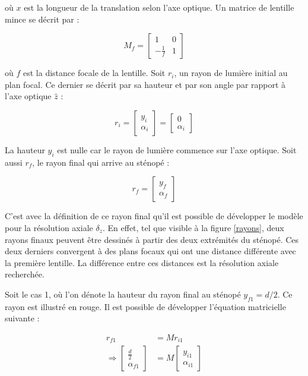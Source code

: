 \documentclass[11pt,letterpaper]{article}
\begin{document}
où $x$ est la longueur de la translation selon l'axe optique. Un matrice de lentille mince se décrit par :

\begin{equation}
  M_{f} = 
  \begin{bmatrix}
    1 & 0 \\
    -\frac{1}{f} & 1
  \end{bmatrix}
\end{equation}

où $f$ est la distance focale de la lentille. Soit $r_i$, un rayon de lumière initial au plan focal. Ce dernier se décrit par sa hauteur et par son angle par rapport à l'axe optique $\hat{z}$ :

\begin{equation}
  r_{i}= 
  \begin{bmatrix}
    y_{i} \\
    \alpha_{i}
  \end{bmatrix}= 
  \begin{bmatrix}
    0 \\
    \alpha_{i}
  \end{bmatrix}
\end{equation}

La hauteur $y_{i}$ est nulle car le rayon de lumière commence sur l'axe optique. Soit aussi $r_{f}$, le rayon final qui arrive au sténopé :

\begin{equation}
  r_{f}= 
  \begin{bmatrix}
    y_{f} \\
    \alpha_{f}
  \end{bmatrix}
\end{equation}

C'est avec la définition de ce rayon final qu'il est possible de développer le modèle pour la résolution axiale $\delta_{z}$. En effet, tel que visible à la figure \ref{rayons}, deux rayons finaux peuvent être dessinés à partir des deux extrémités du sténopé. Ces deux derniers convergent à des plans focaux qui ont une distance différente avec la première lentille. La différence entre ces distances est la résolution axiale recherchée.

Soit le cas 1, où l'on dénote la hauteur du rayon final au sténopé $y_{f1} = d/2$. Ce rayon est illustré en rouge. Il est possible de développer l'équation matricielle suivante :

\begin{align}
  r_{f1}&= M r_{i1}\label{matrixeq}\\
  \Rightarrow\begin{bmatrix}
    \frac{d}{2}  \\
    \alpha_{f1}
  \end{bmatrix} &= 
  M \begin{bmatrix}
    y_{i1} \\
    \alpha_{i1}
  \end{bmatrix}
\end{align}
\end{document}
